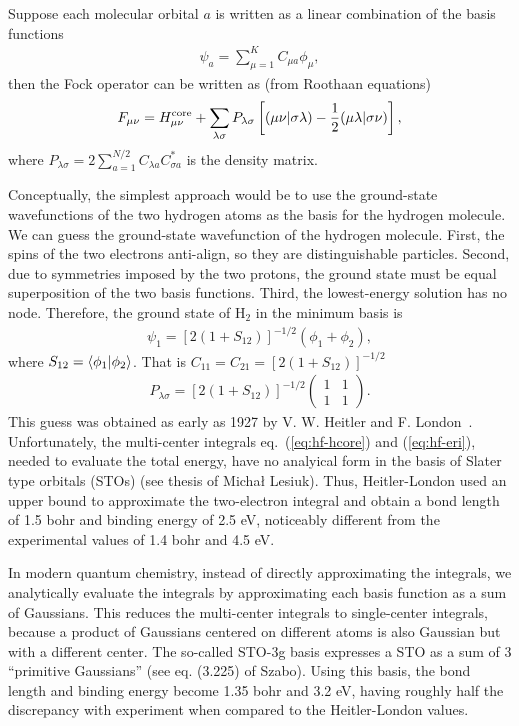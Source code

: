 Suppose each molecular orbital $a$ is written as a linear combination of the basis functions
\begin{align}
\psi_a = \sum\limits_{\mu=1}^K C_{\mu a} \phi_\mu,
\end{align}
then the Fock operator can be written as (from Roothaan equations)
\begin{align} \label{eq:roothaan-fock}
F_{\mu\nu} = H^{\text{core}}_{\mu\nu} + \sum\limits_{\lambda\sigma} P_{\lambda\sigma} \left[
(\mu\nu|\sigma\lambda) - \frac{1}{2}(\mu\lambda|\sigma\nu)
\right],
\end{align} %
where $P_{\lambda\sigma}=2\sum_{a=1}^{N/2} C_{\lambda a}C_{\sigma a}^*$ is the density matrix. %

Conceptually, the simplest approach would be to use the ground-state wavefunctions of the two hydrogen atoms as the basis for the hydrogen molecule. We can guess the ground-state wavefunction of the hydrogen molecule. First, the spins of the two electrons anti-align, so they are distinguishable particles. Second, due to symmetries imposed by the two protons, the ground state must be equal superposition of the two basis functions. Third, the lowest-energy solution has no node. Therefore, the ground state of H$_2$ in the minimum basis is
\begin{align}
\psi_1 = \left[2(1+S_{12})\right]^{-1/2} \left(
\phi_1 + \phi_2
\right),
\end{align}
where $S_{12}=\braket{\phi_1|\phi_2}$. That is $C_{11}=C_{21}=\left[2(1+S_{12})\right]^{-1/2}$
\begin{align} \label{eq:h2-pmat}
P_{\lambda\sigma} = \left[2(1+S_{12})\right]^{-1/2}\left(\begin{array}{cc}
1 & 1 \\
1 & 1
\end{array}\right).
\end{align}
This guess was obtained as early as 1927 by V. W. Heitler and F. London~\cite{Heitler1927}. Unfortunately, the multi-center integrals eq.~(\ref{eq:hf-hcore}) and (\ref{eq:hf-eri}), needed to evaluate the total energy, have no analyical form in the basis of Slater type orbitals (STOs) (see thesis of Michał Lesiuk). Thus, Heitler-London used an upper bound to approximate the two-electron integral and obtain a bond length of 1.5 bohr and binding energy of 2.5 eV, noticeably different from the experimental values of 1.4 bohr and 4.5 eV.

In modern quantum chemistry, instead of directly approximating the integrals, we analytically evaluate the integrals by approximating each basis function as a sum of Gaussians. This reduces the multi-center integrals to single-center integrals, because a product of Gaussians centered on different atoms is also Gaussian but with a different center. The so-called STO-3g basis expresses a STO as a sum of 3 ``primitive Gaussians'' (see eq. (3.225) of Szabo). Using this basis, the bond length and binding energy become 1.35 bohr and 3.2 eV, having roughly half the discrepancy with experiment when compared to the Heitler-London values.

